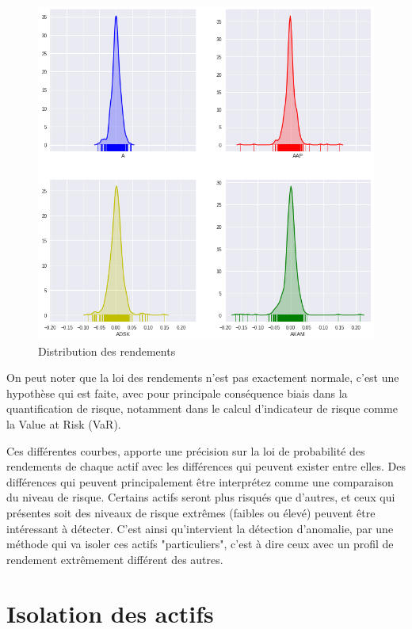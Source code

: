\begin{figure}[H]
\centering
\caption{Distribution des rendements}
   \includegraphics[scale=0.7]{img/distrib2.png}
\end{figure}

On peut noter que la loi des rendements n'est pas exactement normale, c'est une hypothèse qui est faite, avec pour principale conséquence biais dans la quantification de risque, notamment dans le calcul d'indicateur de risque comme la Value at Risk (VaR).

Ces différentes courbes, apporte une précision sur la loi de probabilité des rendements de chaque actif avec les différences qui peuvent exister entre elles. Des différences qui peuvent principalement être interprétez comme une comparaison du niveau de risque. Certains actifs seront plus risqués que d'autres, et ceux qui présentes soit des niveaux de risque extrêmes (faibles ou élevé) peuvent être intéressant à détecter. C'est ainsi qu'intervient la détection d'anomalie, par une méthode qui va isoler ces actifs "particuliers", c'est à dire ceux avec un profil de rendement extrêmement différent des autres.

\section{Isolation des actifs}

